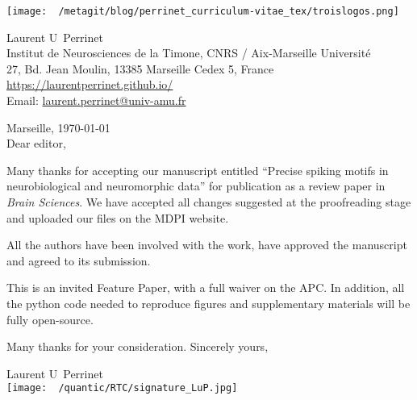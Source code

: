 \documentclass[10pt,english]{article}
\makeatletter
\newcommand{\LastName}{Perrinet}%
\newcommand{\FirstName}{Laurent U}%
\newcommand{\Institute}{Institut de Neurosciences de la Timone, CNRS / Aix-Marseille Universit\'e}%
\newcommand{\Address}{27, Bd. Jean Moulin, 13385 Marseille Cedex 5, France}%
\newcommand{\Website}{\url{https://laurentperrinet.github.io/}}%
\newcommand{\Email}{\url{laurent.perrinet@univ-amu.fr}}%
\makeatother
\begin{document}
\texttt{[image: ~/metagit/blog/perrinet\_curriculum-vitae\_tex/troislogos.png]}
\\
\vspace{.1\baselineskip}
\hrulefill
\vspace{.1\baselineskip}

\begin{flushright}
	\FirstName\  \LastName\  \\
	\Institute\\[6pt]
	\Address\\%
	\Website \\
	  Email: \Email \\[6pt]
\end{flushright}
\justifying
\vspace{1\baselineskip}
Marseille, \today\\[12pt] %
	
Dear editor,

Many thanks for accepting our manuscript entitled ``Precise spiking motifs in neurobiological and neuromorphic data'' for publication as a review paper in \emph{Brain Sciences}. We have accepted all changes suggested at the proofreading stage and uploaded our files on the MDPI website.

All the authors have been involved with the work, have approved the manuscript and agreed to its submission.

This is an invited Feature Paper, with a full waiver on the APC. In addition, all the python code needed to reproduce figures and supplementary materials will be fully open-source.

Many thanks for your consideration.
\vspace{.2\baselineskip}
Sincerely yours,

\vspace{.1cm}

\FirstName\ \LastName \\

\texttt{[image: ~/quantic/RTC/signature\_LuP.jpg]}
\end{document}

